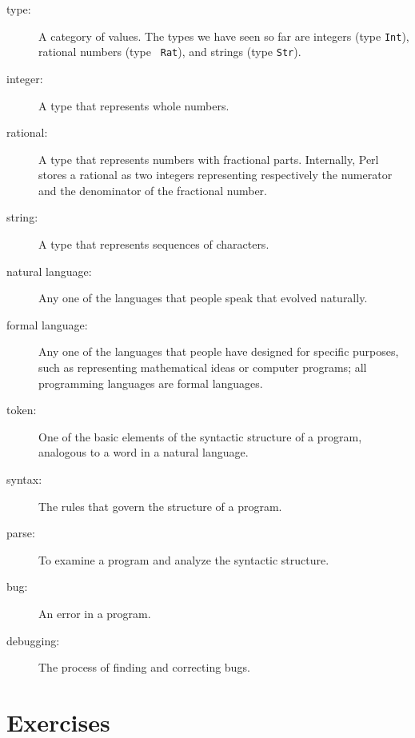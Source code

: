 \begin{description}
\item[type:] A category of values.  The types we have seen so far
are integers (type {\tt Int}), rational numbers (type {\tt
Rat}), and strings (type {\tt Str}).

\item[integer:] A type that represents whole numbers.

\item[rational:] A type that represents numbers with fractional
parts. Internally, Perl stores a rational as two integers 
representing respectively the numerator and the denominator 
of the fractional number.

\item[string:] A type that represents sequences of characters.

\item[natural language:]  Any one of the languages that people speak that
evolved naturally.

\item[formal language:]  Any one of the languages that people have designed
for specific purposes, such as representing mathematical ideas or
computer programs; all programming languages are formal languages.

\item[token:]  One of the basic elements of the syntactic structure of
a program, analogous to a word in a natural language.

\item[syntax:] The rules that govern the structure of a program.

\item[parse:] To examine a program and analyze the syntactic structure.

\item[bug:] An error in a program.

\item[debugging:] The process of finding and correcting bugs.

\end{description}


\section{Exercises}

